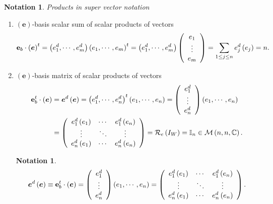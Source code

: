 \documentclass[aps,preprint]{revtex4}%
\newtheorem{notation}[theorem]{Notation}
\begin{document}
\begin{notation}
Products in super vector notation
\end{notation}

\begin{enumerate}
\item $\left(  \boldsymbol{e}\right)  $-basis scalar sum of scalar products of
vectors
\[
\mathbf{e}_{b}\cdot\left(  \boldsymbol{e}\right)  ^{t}=\left(  e_{1}%
^{d},\cdots,e_{m}^{d}\right)  \left(  e_{1},\cdots,e_{m}\right)  ^{t}=\left(
e_{1}^{d},\cdots,e_{m}^{d}\right)  \left(
\begin{array}
[c]{c}%
e_{1}\\
\vdots\\
e_{m}%
\end{array}
\right)  =\sum_{1\leq j\leq n}e_{j}^{d}\left(  e_{j}\right)  =n.
\]


\item $\left(  \boldsymbol{e}\right)  $-basis matrix of scalar products of
vectors%
\begin{align}
\mathbf{e}_{b}^{t}\cdot\left(  \boldsymbol{e}\right)   &  =\boldsymbol{e}%
^{d}\left(  \boldsymbol{e}\right)  =\left(  e_{1}^{d},\cdots,e_{n}^{d}\right)
^{t}\left(  e_{1},\cdots,e_{n}\right)  =\left(
\begin{array}
[c]{c}%
e_{1}^{d}\\
\vdots\\
e_{n}^{d}%
\end{array}
\right)  \left(  e_{1},\cdots,e_{n}\right) \\
&  =\left(
\begin{array}
[c]{ccc}%
e_{1}^{d}\left(  e_{1}\right)  & \cdots & e_{1}^{d}\left(  e_{n}\right) \\
\vdots & \ddots & \vdots\\
e_{n}^{d}\left(  e_{1}\right)  & \cdots & e_{n}^{d}\left(  e_{n}\right)
\end{array}
\right)  =\mathcal{R}_{e}\left(  I_{W}\right)  =\mathbb{I}_{n}\in
\mathcal{M}\left(  n,n,\mathbb{C}\right)  .
\end{align}


\begin{notation}%
\begin{equation}
\boldsymbol{e}^{d}\left(  \boldsymbol{e}\right)  \equiv\mathbf{e}_{b}^{t}%
\cdot\left(  \boldsymbol{e}\right)  =\left(
\begin{array}
[c]{c}%
e_{1}^{d}\\
\vdots\\
e_{n}^{d}%
\end{array}
\right)  \left(  e_{1},\cdots,e_{n}\right)  =\left(
\begin{array}
[c]{ccc}%
e_{1}^{d}\left(  e_{1}\right)  & \cdots & e_{1}^{d}\left(  e_{n}\right) \\
\vdots & \ddots & \vdots\\
e_{n}^{d}\left(  e_{1}\right)  & \cdots & e_{n}^{d}\left(  e_{n}\right)
\end{array}
\right)  .
\end{equation}


\end{notation}
\end{enumerate}
\end{document}
